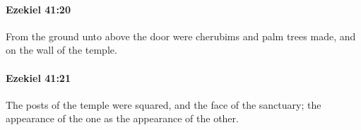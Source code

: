 		\paragraph{Ezekiel 41:20} %
			\label{EZEKIEL-41-20}

			From the ground unto above the door were cherubims and palm trees made, and on the wall of the temple.


		\paragraph{Ezekiel 41:21} %
			\label{EZEKIEL-41-21}

			The posts of the temple were squared, and the face of the sanctuary; the appearance of the one as the appearance of the other.


